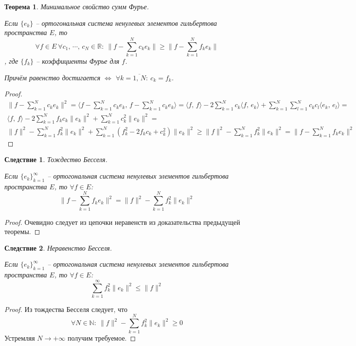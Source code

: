 \documentclass[a4paper,12pt]{article}
\renewcommand{\leq}{\ensuremath{\leqslant}}
\renewcommand{\geq}{\ensuremath{\geqslant}}
\theoremstyle{plain}
\newtheorem{theorem}{Теорема}[section]
\newtheorem*{corollary}{Следствие}
\theoremstyle{definition}
\theoremstyle{remark}
\begin{document}
\begin{theorem}
	Минимальное свойство сумм Фурье.

	Если $\{e_k\}$ -- ортогональная система ненулевых элементов гильбертова пространства $E$, то
	\[\forall f \in E \: \forall c_1,\,\cdots,\,c_N \in \mathbb{R}:\: \|f - \sum_{k = 1}^N c_ke_k\| \geq \|f - \sum_{k = 1}^N f_ke_k\|\], где $\{f_k\}$ -- коэффициенты Фурье для $f$.

	Причём равенство достигается $\Leftrightarrow$ $\forall k = \overline{1,\,N}:\: c_k = f_k$.
\end{theorem}
\begin{proof}
	\begin{align*}
		\|f - \sum_{k=1}^N c_ke_k\|^2 = \langle f - \sum_{k = 1}^N c_ke_k,\, f - \sum_{k = 1}^N c_ke_k\rangle = \langle f,\,f\rangle - 2\sum_{k = 1}^Nc_k \langle f,\, e_k\rangle + \sum_{k = 1}^N\sum_{l = 1}^N c_kc_l \langle e_k,\, e_l \rangle = \\
		\langle f,\, f\rangle - 2\sum_{k = 1}^N f_kc_k \|e_k\|^2 + \sum_{k = 1}^Nc_k^2\|e_k\|^2 =                                                                                                                                                    \\
		\|f\|^2 - \sum_{k = 1}^N f_k^2\|e_k\|^2 + \sum_{k = 1}^N (f_k^2 - 2f_kc_k + c_k^2)\|e_k\|^2 \geq \|f\|^2 - \sum_{k = 1}^Nf_k^2\|e_k\|^2 = \|f - \sum_{k = 1}^N f_ke_k\|^2
	\end{align*}
\end{proof}

\begin{corollary}
	Тождество Бесселя.

	Если $\{e_k\}_{k = 1}^\infty$ -- ортогональная система ненулевых элементов гильбертова пространства $E$, то $\forall f \in E$:
	\[\|f - \sum_{k = 1}^N f_ke_k\|^2 = \|f\|^2 - \sum_{k = 1}^Nf_k^2\|e_k\|^2\]
\end{corollary}
\begin{proof}
	Очевидно следует из цепочки неравенств из доказательства предыдущей теоремы.
\end{proof}

\begin{corollary}
	Неравенство Бесселя.

	Если $\{e_k\}_{k = 1}^\infty$ -- ортогональная система ненулевых элементов гильбертова пространства $E$, то $\forall f \in E$:
	\[\sum_{k = 1}^\infty f_k^2 \|e_k\|^2 \leq \|f\|^2\]
\end{corollary}
\begin{proof}
	Из тождества Бесселя следует, что
	\[\forall N \in \mathbb{N}:\: \|f\|^2 - \sum_{k = 1}^Nf_k^2\|e_k\|^2 \geq 0\]
	Устремляя $N \to +\infty$ получим требуемое.
\end{proof}
\end{document}
